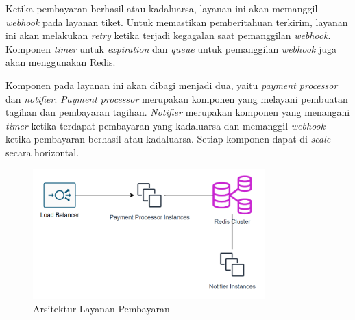 Ketika pembayaran berhasil atau kadaluarsa, layanan ini akan memanggil \textit{webhook} pada layanan tiket. Untuk memastikan pemberitahuan terkirim, layanan ini akan melakukan \textit{retry} ketika terjadi kegagalan saat pemanggilan \textit{webhook}. Komponen \textit{timer} untuk \textit{expiration} dan \textit{queue} untuk pemanggilan \textit{webhook} juga akan menggunakan Redis.

Komponen pada layanan ini akan dibagi menjadi dua, yaitu \textit{payment processor} dan \textit{notifier}. \textit{Payment processor} merupakan komponen yang melayani pembuatan tagihan dan pembayaran tagihan. \textit{Notifier} merupakan komponen yang menangani \textit{timer} ketika terdapat pembayaran yang kadaluarsa dan  memanggil \textit{webhook} ketika pembayaran berhasil atau kadaluarsa. Setiap komponen dapat di-\textit{scale} secara horizontal.

\begin{figure}[htbp]
    \centering
    \includegraphics[width=0.8\textwidth]{resources/appendix/payment-service.png}
    \caption{Arsitektur Layanan Pembayaran}
    \label{fig:payment-service-deployment}
\end{figure}
